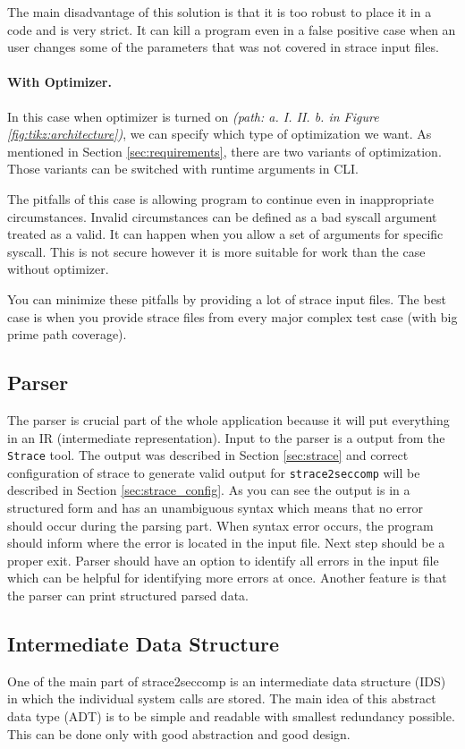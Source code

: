 The main disadvantage of this solution is that it is too robust to place it in a
code and is very strict. It can kill a program even in a false positive case
when an user changes some of the parameters that was not covered in strace input
files.

\paragraph{With Optimizer.}
In this case when optimizer is turned on \textit{(path: a. I. II. b. in Figure
\ref{fig:tikz:architecture})}, we can specify which type of optimization we
want. As mentioned in Section \ref{sec:requirements}, there are two variants of
optimization. Those variants can be switched with runtime arguments in CLI.

The pitfalls of this case is allowing program to continue even in inappropriate
circumstances. Invalid circumstances can be defined as a bad syscall argument
treated as a valid. It can happen when you allow a set of arguments for specific
syscall. This is not secure however it is more suitable for work than the case
without optimizer.

You can minimize these pitfalls by providing a lot of strace input files. The
best case is when you provide strace files from every major complex test case
(with big prime path coverage).

\subsection{Parser}
The parser is crucial part of the whole application because
it will put everything in an IR (intermediate representation). Input to the
parser is a output from the \texttt{Strace} tool. The output was described in
Section \ref{sec:strace} and correct configuration of strace to generate valid
output for \texttt{strace2seccomp} will be described in Section
\ref{sec:strace_config}. As you can see the output is in a structured form and
has an unambiguous syntax which means that no error should occur during the
parsing part. When syntax error occurs, the program should inform where the
error is located in the input file. Next step should be a proper exit. Parser
should have an option to identify all errors in the input file which can be
helpful for identifying more errors at once. Another feature is that the parser
can print structured parsed data.

\subsection{Intermediate Data Structure}
\label{ids:description}
One of the main part of strace2seccomp is an intermediate data structure (IDS) in
which the individual system calls are stored. The main idea of this abstract
data type (ADT) is to be simple and readable with smallest redundancy possible.
This can be done only with good abstraction and good design.

